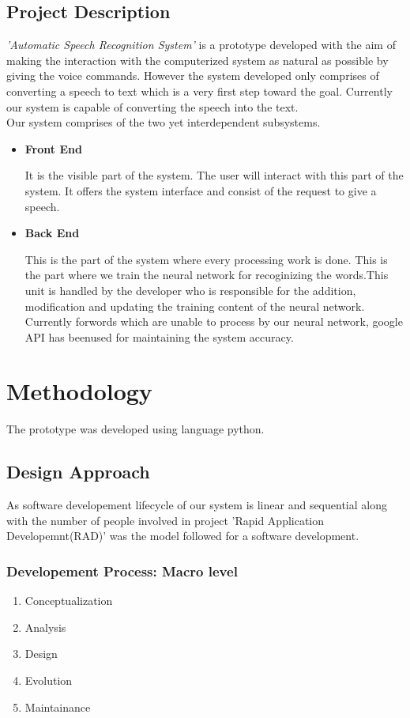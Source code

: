 \documentclass[a4paper,12pt,onepage]{article}
\begin{document}
	\subsection{Project Description}
	\emph{'Automatic Speech Recognition System'} is a prototype developed with the aim of making the interaction with the computerized system as natural as possible by giving the voice commands. However the system developed only comprises of converting a speech to text which is a very first step toward the goal. Currently our system is capable of converting the speech into the text.\\
Our system comprises of the two yet interdependent subsystems.
\begin{itemize}
\item \textbf{Front End} 
\par
It is the visible part of the system. The user will interact with this part of the system. It offers the system interface and consist of the request to give a speech.
\item \textbf{Back End}
\par
This is the part of the system where every processing work is done. This is the part where we train the neural network for recoginizing the words.This unit is handled by the developer who is responsible for the addition, modification and updating the training content of the neural network. Currently forwords which are unable to process by our neural network, google API has beenused for maintaining the system accuracy.
\end{itemize}
	\newpage
\section{Methodology}
The prototype was developed using language python.
\subsection{Design Approach}
As software developement lifecycle of our system is linear and sequential along with the number of people involved in project 'Rapid Application Developemnt(RAD)' was the model followed for a software development.
\subsubsection{Developement Process: Macro level}
\begin{enumerate}
\item Conceptualization
\newpage
\item Analysis
\newpage
\item Design
\newpage
\item Evolution
\newpage
\item Maintainance
\newpage
\end{enumerate}
\end{document}
